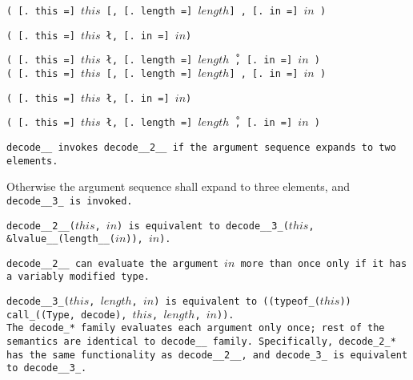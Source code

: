 
\s\s\s\s\tt{(} [\tt{. this =}] $this$ [\tt{,}
[\tt{. length =}] $length$] \tt{,} [\tt{. in =}] $in$ \tt{)}

\s\tt{(} [\tt{. this =}] $this$
\l\tt{,} [\tt{. in =}] $in$\r \tt{)}

\s\s\tt{(} [\tt{. this =}] $this$ \l\tt{,}
[\tt{. length =}] $length$\r\ \tt{,} [\tt{. in =}] $in$ \tt{)}\\

\s\s\s\s\s\tt{(} [\tt{. this =}] $this$ [\tt{,}
[\tt{. length =}] $length$] \tt{,} [\tt{. in =}] $in$ \tt{)}

\s\s\s\tt{(} [\tt{. this =}] $this$
\l\tt{,} [\tt{. in =}] $in$\r \tt{)}

\s\s\s\tt{(} [\tt{. this =}] $this$ \l\tt{,}
[\tt{. length =}] $length$\r\ \tt{,} [\tt{. in =}] $in$ \tt{)}


\tt{decode__} invokes \tt{decode__2__} if the
argument sequence expands to two elements.

Otherwise the argument sequence shall expand to
three elements, and \tt{decode__3_} is invoked.

\tt{decode__2__(}$this$\tt{,} $in$\tt{)} is equivalent to
\tt{decode__3_(}$this$\tt{, &lvalue__(length__(}$in$\tt{)),} $in$\tt{)}.

\tt{decode__2__} can evaluate the argument $in$ more
than once only if it has a variably modified type.

\tt{decode__3_(}$this$\tt{,} $length$\tt{,} $in$\tt{)}
is equivalent to \tt{((typeof_(}$this$\tt{))
call_((Type, decode),} $this$\tt{,} $length$\tt{,} $in$\tt{))}.\\

The \tt{decode_}* family evaluates each argument only once;
rest of the semantics are identical to \tt{decode__} family.
Specifically, \tt{decode_2_}* has the same functionality as \tt{decode__2__},
and \tt{decode_3_} is equivalent to \tt{decode__3_}.
